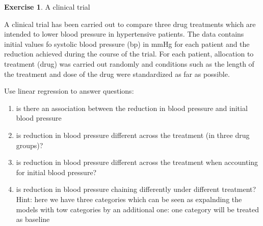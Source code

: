 \documentclass[
]{book}
\newenvironment{Shaded}{\begin{snugshade}}{\end{snugshade}}
\newcommand{\CommentTok}[1]{\textcolor[rgb]{0.56,0.35,0.01}{\textit{#1}}}
\newcommand{\DataTypeTok}[1]{\textcolor[rgb]{0.13,0.29,0.53}{#1}}
\newcommand{\KeywordTok}[1]{\textcolor[rgb]{0.13,0.29,0.53}{\textbf{#1}}}
\newcommand{\NormalTok}[1]{#1}
\newcommand{\OperatorTok}[1]{\textcolor[rgb]{0.81,0.36,0.00}{\textbf{#1}}}
\newcommand{\StringTok}[1]{\textcolor[rgb]{0.31,0.60,0.02}{#1}}
\providecommand{\tightlist}{%
  \setlength{\itemsep}{0pt}\setlength{\parskip}{0pt}}
\theoremstyle{definition}
\theoremstyle{definition}
\theoremstyle{definition}
\newtheorem{exercise}{Exercise}[chapter]
\theoremstyle{remark}
\begin{document}
\begin{Shaded}
\end{Shaded}

\begin{exercise}
\protect\hypertarget{exr:lm-blooddrug}{}{\label{exr:lm-blooddrug} }A clinical trial

A clinical trial has been carried out to compare three drug treatments which are intended to lower blood pressure in hypertensive patients. The data contains initial values fo systolic blood pressure (bp) in mmHg for each patient and the reduction achieved during the course of the trial. For each patient, allocation to treatment (drug) was carried out randomly and conditions such as the length of the treatment and dose of the drug were standardized as far as possible.

Use linear regression to answer questions:

\begin{enumerate}
\def\labelenumi{\alph{enumi})}
\tightlist
\item
  is there an association between the reduction in blood pressure and initial blood pressure
\item
  is reduction in blood pressure different across the treatment (in three drug groups)?
\item
  is reduction in blood pressure different across the treatment when accounting for initial blood pressure?
\item
  is reduction in blood pressure chaining differently under different treatment?
  Hint: here we have three categories which can be seen as expalnding the models with tow categories by an additional one: one category will be treated as baseline
\end{enumerate}
\end{exercise}

\begin{Shaded}
\end{Shaded}
\end{document}
